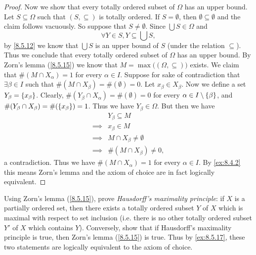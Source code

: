 \begin{proof}
  Now we show that every totally ordered subset of \(\Omega\) has an upper bound.
  Let \(S \subseteq \Omega\) such that \((S, \subseteq)\) is totally ordered.
  If \(S = \emptyset\), then \(\emptyset \subseteq \emptyset\) and the claim follows vacuously.
  So suppose that \(S \neq \emptyset\).
  Since \(\bigcup S \in \Omega\) and
  \[
    \forall Y \in S, Y \subseteq \bigcup S,
  \]
  by \cref{8.5.12} we know that \(\bigcup S\) is an upper bound of \(S\) (under the relation \(\subseteq\)).
  Thus we conclude that every totally ordered subset of \(\Omega\) has an upper bound.
  By Zorn's lemma (\cref{8.5.15}) we know that \(M = \max\big((\Omega, \subseteq)\big)\) exists.
  We claim that \(\#(M \cap X_{\alpha}) = 1\) for every \(\alpha \in I\).
  Suppose for sake of contradiction that \(\exists \beta \in I\) such that \(\#(M \cap X_{\beta}) = \#(\emptyset) = 0\).
  Let \(x_{\beta} \in X_{\beta}\).
  Now we define a set \(Y_{\beta} = \left\lbrace x_{\beta}\right\rbrace\).
  Clearly, \(\#(Y_{\beta} \cap X_{\alpha}) = \#(\emptyset) = 0\) for every \(\alpha \in I \setminus \left\lbrace\beta\right\rbrace\), and \(\#(Y_{\beta} \cap X_{\beta}) = \#(\left\lbrace x_{\beta}\right\rbrace) = 1\).
  Thus we have \(Y_{\beta} \in \Omega\).
  But then we have
  \begin{align*}
             & Y_{\beta} \subseteq M           \\
    \implies & x_{\beta} \in M                 \\
    \implies & M \cap X_{\beta} \neq \emptyset \\
    \implies & \#(M \cap X_{\beta}) \neq 0,
  \end{align*}
  a contradiction.
  Thus we have \(\#(M \cap X_{\alpha}) = 1\) for every \(\alpha \in I\).
  By \cref{ex:8.4.2} this means Zorn's lemma and the axiom of choice are in fact logically equivalent.
\end{proof}

\begin{ex}\label{ex:8.5.18}
  Using Zorn's lemma (\cref{8.5.15}), prove \emph{Hausdorff's maximality principle}:
  if \(X\) is a partially ordered set, then there exists a totally ordered subset \(Y\) of \(X\) which is maximal with respect to set inclusion
  (i.e. there is no other totally ordered subset \(Y'\) of \(X\) which contains \(Y\)).
  Conversely, show that if Hausdorff's maximality principle is true, then Zorn's lemma (\cref{8.5.15}) is true.
  Thus by \cref{ex:8.5.17}, these two statements are logically equivalent to the axiom of choice.
\end{ex}

